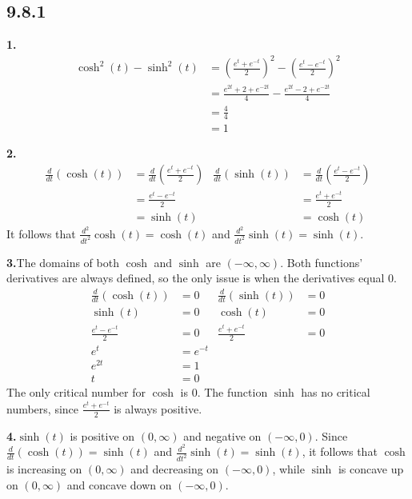 \documentclass[10pt,oneside,]{book}
\theoremstyle{plain}
\theoremstyle{definition}
\numberwithin{equation}{section}
\newcommand{\fe}[2]{#1\mathopen{}\left(#2\right)\mathclose{}}
\newcommand{\ointerval}[2]{\left(#1,#2\right)}
\newcommand{\lzoo}[2]{{\frac{d}{d#1}}{\left(#2\right)}}
\newcommand{\lzon}[2]{\frac{d^{#1}}{d#2^{#1}}}
\begin{document}
\subsection*{9.8.1 }
\noindent\textbf{1.}\quad{}\begin{align*}
\fe{\cosh^2}{t}-\fe{\sinh^2}{t}&=\left(\frac{e^{t}+e^{-t}}{2}\right)^2-\left(\frac{e^{t}-e^{-t}}{2}\right)^2\\
&=\frac{e^{2t}+2+e^{-2t}}{4}-\frac{e^{2t}-2+e^{-2t}}{4}\\
&=\frac{4}{4}\\
&=1
\end{align*}%
\par\smallskip
\noindent\textbf{2.}\quad{}\begin{align*}
\lzoo{t}{\fe{\cosh}{t}}&=\lzoo{t}{\frac{e^{t}+e^{-t}}{2}}&\lzoo{t}{\fe{\sinh}{t}}&=\lzoo{t}{\frac{e^{t}-e^{-t}}{2}}\\
&=\frac{e^{t}-e^{-t}}{2}&&=\frac{e^{t}+e^{-t}}{2}\\
&=\fe{\sinh}{t}&&=\fe{\cosh}{t}
\end{align*}It follows that \(\lzon{2}{t}{\fe{\cosh}{t}}=\fe{\cosh}{t}\) and \(\lzon{2}{t}{\fe{\sinh}{t}}=\fe{\sinh}{t}\).%
\par\smallskip
\noindent\textbf{3.}\quad{}The domains of both \(\cosh\) and \(\sinh\) are \(\ointerval{-\infty}{\infty}\). Both functions' derivatives are always defined, so the only issue is when the derivatives equal \(0\).\begin{align*}
\lzoo{t}{\fe{\cosh}{t}}&=0&\lzoo{t}{\fe{\sinh}{t}}&=0\\
\fe{\sinh}{t}&=0&\fe{\cosh}{t}&=0\\
\frac{e^{t}-e^{-t}}{2}&=0&\frac{e^{t}+e^{-t}}{2}&=0\\
e^{t}&=e^{-t}&&\\
e^{2t}&=1&&\\
t&=0&&
\end{align*}The only critical number for \(\cosh\) is \(0\). The function \(\sinh\) has no critical numbers, since \(\frac{e^{t}+e^{-t}}{2}\) is always positive.%
\par\smallskip
\noindent\textbf{4.}\quad{}\(\fe{\sinh}{t}\) is positive on \(\ointerval{0}{\infty}\) and negative on \(\ointerval{-\infty}{0}\). Since \(\lzoo{t}{\fe{\cosh}{t}}=\fe{\sinh}{t}\) and \(\lzon{2}{t}{\fe{\sinh}{t}}=\fe{\sinh}{t}\), it follows that \(\cosh\) is increasing on \(\ointerval{0}{\infty}\) and decreasing on \(\ointerval{-\infty}{0}\), while \(\sinh\) is concave up on \(\ointerval{0}{\infty}\) and concave down on \(\ointerval{-\infty}{0}\).%
\end{document}
